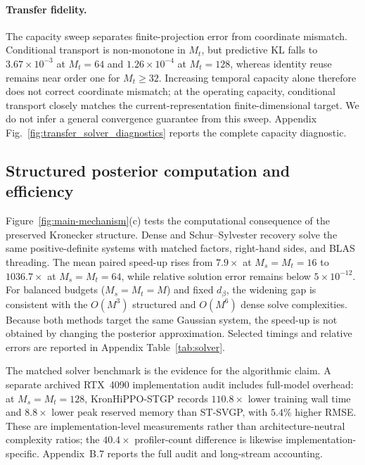 \documentclass[twoside]{article}
\begin{document}
\paragraph{Transfer fidelity.}
The capacity sweep separates finite-projection error from coordinate mismatch. Conditional transport is non-monotone in $M_t$, but predictive KL falls to $3.67\times10^{-3}$ at $M_t=64$ and $1.26\times10^{-4}$ at $M_t=128$, whereas identity reuse remains near order one for $M_t\ge32$. Increasing temporal capacity alone therefore does not correct coordinate mismatch; at the operating capacity, conditional transport closely matches the current-representation finite-dimensional target. We do not infer a general convergence guarantee from this sweep. Appendix Fig.~\ref{fig:transfer_solver_diagnostics} reports the complete capacity diagnostic.

\subsection{Structured posterior computation and efficiency}

Figure~\ref{fig:main-mechanism}(c) tests the computational consequence of the preserved Kronecker structure. Dense and Schur--Sylvester recovery solve the same positive-definite systems with matched factors, right-hand sides, and BLAS threading. The mean paired speed-up rises from $7.9\times$ at $M_s=M_t=16$ to $1036.7\times$ at $M_s=M_t=64$, while relative solution error remains below $5\times10^{-12}$. For balanced budgets ($M_s=M_t=M$) and fixed $d_\beta$, the widening gap is consistent with the $O(M^3)$ structured and $O(M^6)$ dense solve complexities. Because both methods target the same Gaussian system, the speed-up is not obtained by changing the posterior approximation. Selected timings and relative errors are reported in Appendix Table~\ref{tab:solver}.

The matched solver benchmark is the evidence for the algorithmic claim. A separate archived RTX~4090 implementation audit includes full-model overhead: at $M_s=M_t=128$, KronHiPPO-STGP records $110.8\times$ lower training wall time and $8.8\times$ lower peak reserved memory than ST-SVGP, with $5.4\%$ higher RMSE. These are implementation-level measurements rather than architecture-neutral complexity ratios; the $40.4\times$ profiler-count difference is likewise implementation-specific. Appendix~B.7 reports the full audit and long-stream accounting.

\FloatBarrier
\end{document}
